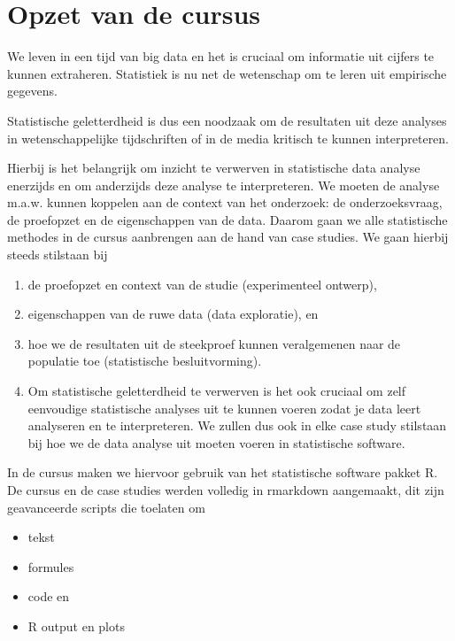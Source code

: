 \documentclass[
  12pt,dutch,coursenotes]{book}
\providecommand{\tightlist}{%
  \setlength{\itemsep}{0pt}\setlength{\parskip}{0pt}}
\begin{document}
\hypertarget{opzet-van-de-cursus}{%
\section{Opzet van de cursus}\label{opzet-van-de-cursus}}

We leven in een tijd van big data en het is cruciaal om informatie uit cijfers te kunnen extraheren. Statistiek is nu net de wetenschap om te leren uit empirische gegevens.

Statistische geletterdheid is dus een noodzaak om de resultaten uit deze analyses in wetenschappelijke tijdschriften of in de media kritisch te kunnen interpreteren.

Hierbij is het belangrijk om inzicht te verwerven in statistische data analyse enerzijds en om anderzijds deze analyse te interpreteren. We moeten de analyse m.a.w. kunnen koppelen aan de context van het onderzoek: de onderzoeksvraag, de proefopzet en de eigenschappen van de data.
Daarom gaan we alle statistische methodes in de cursus aanbrengen aan de hand van case studies.
We gaan hierbij steeds stilstaan bij

\begin{enumerate}
\def\labelenumi{\arabic{enumi}.}
\item
  de proefopzet en context van de studie (experimenteel ontwerp),
\item
  eigenschappen van de ruwe data (data exploratie), en
\item
  hoe we de resultaten uit de steekproef kunnen veralgemenen naar de populatie toe (statistische besluitvorming).
\item
  Om statistische geletterdheid te verwerven is het ook cruciaal om zelf eenvoudige statistische analyses uit te kunnen voeren zodat je data leert analyseren en te interpreteren. We zullen dus ook in elke case study stilstaan bij hoe we de data analyse uit moeten voeren in statistische software.
\end{enumerate}

In de cursus maken we hiervoor gebruik van
het statistische software pakket R. De cursus en de case studies werden volledig in rmarkdown aangemaakt, dit zijn geavanceerde scripts die toelaten om

\begin{itemize}
\tightlist
\item
  tekst
\item
  formules
\item
  code en
\item
  R output en plots
\end{itemize}
\end{document}
